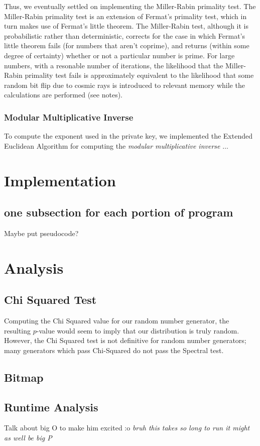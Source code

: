 \documentclass{article}
\begin{document}
Thus, we eventually settled on implementing the Miller-Rabin primality test. The Miller-Rabin primality test is an extension of Fermat's primality test, which in turn makes use of Fermat's little theorem. The Miller-Rabin test, although it is probabilistic rather than deterministic, corrects for the case in which Fermat's little theorem fails (for numbers that aren't coprime), and returns (within some degree of certainty) whether or not a particular number is prime. For large numbers, with a resonable number of iterations, the likelihood that the Miller-Rabin primality test fails is approximately equivalent to the likelihood that some random bit flip due to cosmic rays is introduced to relevant memory while the calculations are performed (see notes).

\subsubsection{Modular Multiplicative Inverse}
To compute the exponent used in the private key, we implemented the Extended Euclidean Algorithm for computing the \textit{modular multiplicative inverse} \cite{mmi} $\dots$


\section{Implementation}
\subsection{one subsection for each portion of program}
Maybe put pseudocode?


\section{Analysis}
\subsection{Chi Squared Test}
Computing the Chi Squared value for our random number generator, the resulting $p$-value would seem to imply that our distribution is truly random. However, the Chi Squared test is not definitive for random number generators; many generators which pass Chi-Squared do not pass the Spectral test.

\subsection{Bitmap}
\subsection{Runtime Analysis}
Talk about big O to make him excited :o \textit{bruh this takes so long to run it might as well be big P}
\end{document}
